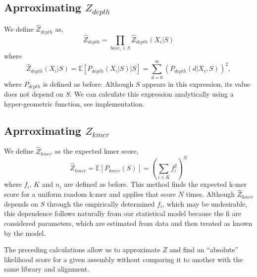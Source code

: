 \documentclass[phd,tocprelim]{cornell}
\begin{document}

\subsection{Aprroximating $Z_{depth}$} %
\label{sub:Aprroximating Z_depth}

We define $\hat{Z}_{depth}$ as,
\begin{equation}
    \hat{Z}_{depth} = \prod_{base_{i} \in S} \hat{Z}_{depth} \left(X_{i}|S\right)
\end{equation}
where
\begin{equation}
    \hat{Z}_{depth} \left(X_{i}|S\right) = \mathbb{E}\left[P_{depth} \left(X_{i}|S\right)|S\right] = \sum_{d=0}^{\infty} \left(P_{depth}\left(d | X_{i}, S\right)\right)^{2},
\end{equation}
where $P_{depth}$ is defined as before. Although $S$ appears in this expression, its value does not depend on $S$. We can calculate this expression analytically using a hyper-geometric function, see implementation.


\subsection{Aprroximating $Z_{kmer}$} %
\label{sub:Aprroximating Z_kmer}

We define $\hat{Z}_{kmer}$ as the expected kmer score,
\begin{equation}
    \hat{Z}_{kmer} = \mathbb{E}\left[P_{kmer}(S)\right] = \left(\sum_{i\in K} f_{i}^{2}\right)^{N}
\end{equation}
where $f_{i}$, $K$ and $n_{i}$ are defined as before. This method finds the expected k-mer score for a uniform random k-mer and applies that score $N$ times. Although $\hat{Z}_{kmer}$ depends on $S$ through the empirically determined $f_{i}$, which may be undesirable, this dependence follows naturally from our statistical model because the fi are considered parameters, which are estimated from data and then treated as known by the model. 


The preceding calculations allow us to approximate $Z$ and find an “absolute” likelihood score for a given assembly without comparing it to another with the same library and alignment.

\end{document}
